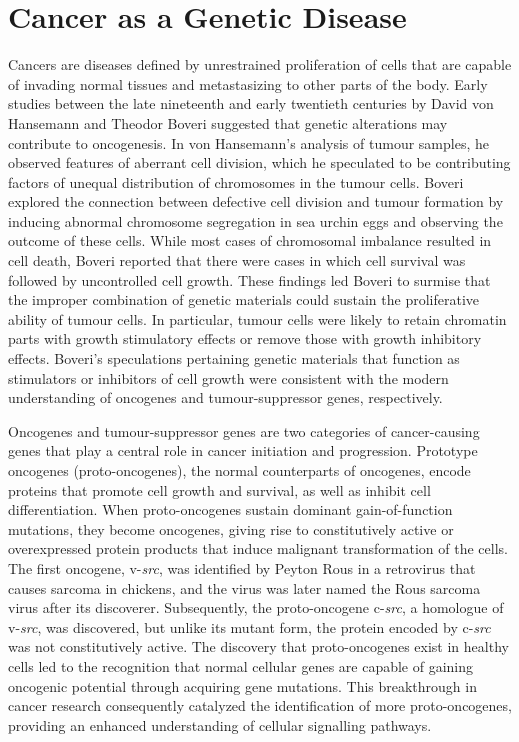 \section{Cancer as a Genetic Disease}
\label{sec:CancerasaGeneticDisease}

Cancers are diseases defined by unrestrained proliferation of cells that are capable of invading normal tissues and metastasizing to other parts of the body. Early studies between the late nineteenth and early twentieth centuries by David von Hansemann and Theodor Boveri suggested that genetic alterations may contribute to oncogenesis. In von Hansemann's analysis of tumour samples, he observed features of aberrant cell division, which he speculated to be contributing factors of unequal distribution of chromosomes in the tumour cells. Boveri explored the connection between defective cell division and tumour formation by inducing abnormal chromosome segregation in sea urchin eggs and observing the outcome of these cells. While most cases of chromosomal imbalance resulted in cell death, Boveri reported that there were cases in which cell survival was followed by uncontrolled cell growth. These findings led Boveri to surmise that the improper combination of genetic materials could sustain the proliferative ability of tumour cells. In particular, tumour cells were likely to retain chromatin parts with growth stimulatory effects or remove those with growth inhibitory effects. Boveri's speculations pertaining genetic materials that function as stimulators or inhibitors of cell growth were consistent with the modern understanding of oncogenes and tumour-suppressor genes, respectively.

Oncogenes and tumour-suppressor genes are two categories of cancer-causing genes that play a central role in cancer initiation and progression. Prototype oncogenes (proto-oncogenes), the normal counterparts of oncogenes, encode proteins that promote cell growth and survival, as well as inhibit cell differentiation. When proto-oncogenes sustain dominant gain-of-function mutations, they become oncogenes, giving rise to constitutively active or overexpressed protein products that induce malignant transformation of the cells. The first oncogene, v-\textit{src}, was identified by Peyton Rous in a retrovirus that causes sarcoma in chickens, and the virus was later named the Rous sarcoma virus after its discoverer. Subsequently, the proto-oncogene c-\textit{src}, a homologue of v-\textit{src}, was discovered, but unlike its mutant form, the protein encoded by c-\textit{src} was not constitutively active. The discovery that proto-oncogenes exist in healthy cells led to the recognition that normal cellular genes are capable of gaining oncogenic potential through acquiring gene mutations. This breakthrough in cancer research consequently catalyzed the identification of more proto-oncogenes, providing an enhanced understanding of cellular signalling pathways.

